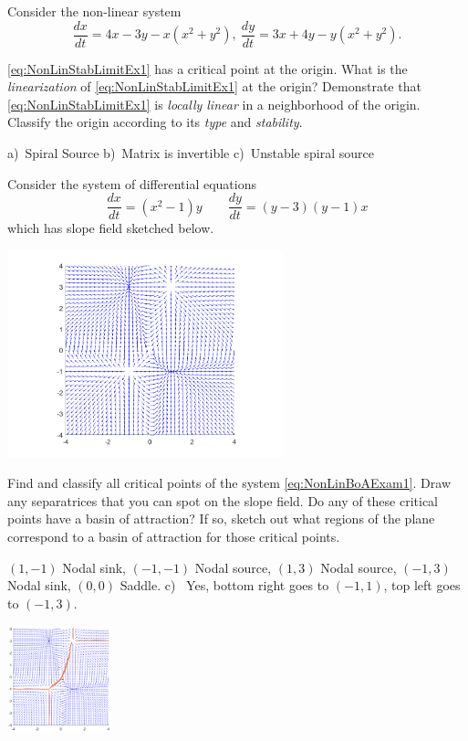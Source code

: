 \begin{exercise}
Consider the non-linear system
\begin{equation}
\frac{dx}{dt}=4x-3y-x(x^2+y^2), \ \frac{dy}{dt}=3x+4y-y(x^2+y^2). \label{eq:NonLinStabLimitEx1} %
\end{equation}
\begin{tasks}
\task \eqref{eq:NonLinStabLimitEx1} has a critical point at the origin. What is the {\it linearization} of \eqref{eq:NonLinStabLimitEx1} at the origin?
\task Demonstrate that \eqref{eq:NonLinStabLimitEx1} is {\it locally linear} in a neighborhood of the origin. 
\task Classify the origin according to its {\it type} and {\it stability}.
\end{tasks}
\end{exercise}
\comboSol{%
}
{%
a)~Spiral Source \quad b)~Matrix is invertible \quad c)~Unstable spiral source
}

\begin{exercise} 
Consider the system of differential equations
\begin{equation}
\frac{dx}{dt} = (x^2 - 1)y \qquad \frac{dy}{dt} = (y-3)(y-1)x \label{eq:NonLinBoAExam1}
\end{equation}
which has slope field sketched below.
\begin{center}
\includegraphics[width=0.6\textwidth]{Images/NLBoA_Ex1.png}
\end{center}
\begin{tasks}
\task Find and classify all critical points of the system \eqref{eq:NonLinBoAExam1}.
\task Draw any separatrices that you can spot on the slope field.
\task Do any of these critical points have a basin of attraction? If so, sketch out what regions of the plane correspond to a basin of attraction for those critical points. 
\end{tasks}
\end{exercise}
\comboSol{%
}
{%
\begin{multicols}{2}
\noindent $(1, -1)$ Nodal sink, $(-1, -1)$ Nodal source, $(1, 3)$ Nodal source, $(-1, 3)$ Nodal sink, $(0,0)$ Saddle. 
 \quad c)~ Yes, bottom right goes to $(-1, 1)$, top left goes to $(-1, 3)$.
 
 \includegraphics[width=1.2in]{Images/NLBoA_Ex1_Soln.png}
\end{multicols}
}

